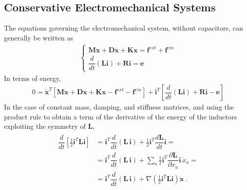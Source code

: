 \documentclass[letterpaper,10pt,english]{jupyterBook}
\begin{document}
\subsection{Conservative Electromechanical Systems}
\label{\detokenize{ch/circuits-electromechanic-old:conservative-electromechanical-systems}}
\sphinxAtStartPar
The equations governing the electromechanical system, without capacitors, can generally be written as
\begin{equation*}
\begin{split}\begin{cases}
 \mathbf{M} \ddot{\mathbf{x}} + \mathbf{D} \dot{\mathbf{x}} + \mathbf{K} \mathbf{x} = \mathbf{f}^{ext} + \mathbf{f}^{em} \\
 \dfrac{d}{dt} \left( \mathbf{L} \mathbf{i} \right) + \mathbf{R} \mathbf{i} = \mathbf{e}
\end{cases}\end{split}
\end{equation*}
\sphinxAtStartPar
In terms of energy,
\begin{equation*}
\begin{split}
0 = \dot{\mathbf{x}}^T \left[ \mathbf{M} \ddot{\mathbf{x}} + \mathbf{D} \dot{\mathbf{x}} + \mathbf{K} \mathbf{x} - \mathbf{f}^{ext} - \mathbf{f}^{em} \right] + \mathbf{i}^T \left[ \dfrac{d}{dt} \left( \mathbf{L} \mathbf{i} \right) + \mathbf{R} \mathbf{i} - \mathbf{e} \right]
\end{split}
\end{equation*}
\sphinxAtStartPar
In the case of constant mass, damping, and stiffness matrices, and using the product rule to obtain a term of the derivative of the energy of the inductors exploiting the symmetry of \(\mathbf{L}\),
\begin{equation}\label{equation:ch/circuits-electromechanic-old:classical-electromagnetism:circuits-electromechanic:energy-mech-0}
\begin{split} \begin{aligned}
\dfrac{d}{dt} \left[ \frac{1}{2} \mathbf{i}^T \mathbf{L} \mathbf{i} \right]
  & = \mathbf{i}^T \dfrac{d}{dt} \left( \mathbf{L} \, \mathbf{i} \right) + \frac{1}{2} \mathbf{i}^T \dfrac{d \mathbf{L}}{dt} \mathbf{i} = \\
  & = \mathbf{i}^T \dfrac{d}{dt} \left( \mathbf{L} \, \mathbf{i} \right) + \sum_{a} \frac{1}{2} \mathbf{i}^T \dfrac{\partial \mathbf{L}}{\partial x_a} \mathbf{i} \, \dot{x}_a = \\
  & = \mathbf{i}^T \dfrac{d}{dt} \left( \mathbf{L} \, \mathbf{i} \right) + \nabla \left( \frac{1}{2} \mathbf{i}^T \mathbf{L} \mathbf{i} \right) \dot{\mathbf{x}}  \ .
\end{aligned}\end{split}
\end{equation}
\end{document}
